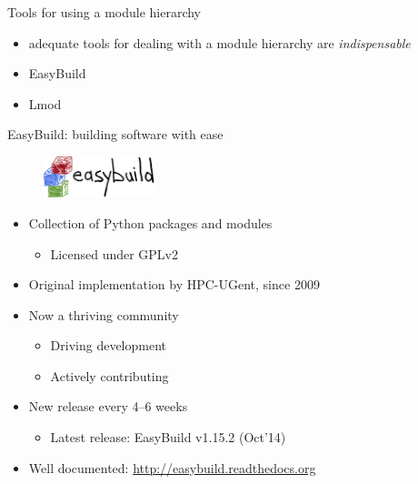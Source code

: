 \documentclass[10pt,xcolor={usenames,dvipsnames}]{beamer}
\begin{document}

\begin{frame}{Tools for using a module hierarchy}
    \begin{itemize}
        \item adequate tools for dealing with a module hierarchy are \emph{indispensable}
        \item EasyBuild
        \item Lmod
    \end{itemize}
\end{frame}


\begin{frame}{EasyBuild: building software with ease}
\begin{figure}[centering]
    \includegraphics[height=1.2cm]{easybuild_logo.jpg}
\end{figure}
\begin{itemize}
    \item
        Collection of Python packages and modules
        \begin{itemize}
            \item
                Licensed under GPLv2
        \end{itemize}
    \item
        Original implementation by HPC-UGent, since 2009
    \item
        Now a thriving community
        \begin{itemize}
            \item Driving development
            \item Actively contributing
        \end{itemize}
    \item
        New release every 4--6 weeks
        \begin{itemize}
            \item Latest release: EasyBuild v1.15.2 (Oct'14)
        \end{itemize}
    \item
        Well documented: \url{http://easybuild.readthedocs.org}
\end{itemize}
\end{frame}
\end{document}
